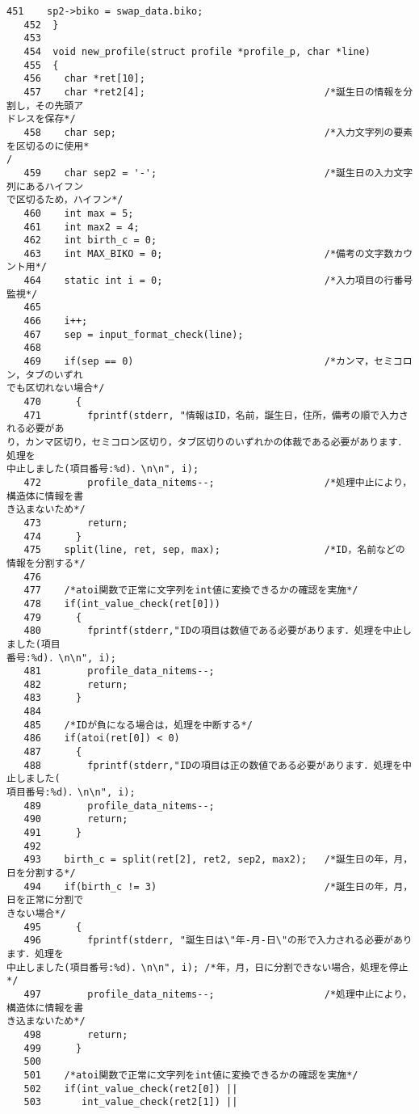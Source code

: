\begin{Verbatim}[fontsize=\small, baselinestretch=0.8]
   451	  sp2->biko = swap_data.biko;
   452	}
   453	
   454	void new_profile(struct profile *profile_p, char *line)
   455	{
   456	  char *ret[10];
   457	  char *ret2[4];                               /*誕生日の情報を分割し，その先頭ア
ドレスを保存*/
   458	  char sep;                                    /*入力文字列の要素を区切るのに使用*
/
   459	  char sep2 = '-';                             /*誕生日の入力文字列にあるハイフン
で区切るため，ハイフン*/
   460	  int max = 5;
   461	  int max2 = 4;
   462	  int birth_c = 0;
   463	  int MAX_BIKO = 0;                            /*備考の文字数カウント用*/
   464	  static int i = 0;                            /*入力項目の行番号監視*/
   465	  
   466	  i++;
   467	  sep = input_format_check(line);
   468	
   469	  if(sep == 0)                                 /*カンマ，セミコロン，タブのいずれ
でも区切れない場合*/
   470	    {
   471	      fprintf(stderr, "情報はID，名前，誕生日，住所，備考の順で入力される必要があ
り，カンマ区切り，セミコロン区切り，タブ区切りのいずれかの体裁である必要があります．処理を
中止しました(項目番号:%d)．\n\n", i);
   472	      profile_data_nitems--;                   /*処理中止により，構造体に情報を書
き込まないため*/
   473	      return;
   474	    }
   475	  split(line, ret, sep, max);                  /*ID，名前などの情報を分割する*/
   476	
   477	  /*atoi関数で正常に文字列をint値に変換できるかの確認を実施*/
   478	  if(int_value_check(ret[0]))
   479	    {
   480	      fprintf(stderr,"IDの項目は数値である必要があります．処理を中止しました(項目
番号:%d)．\n\n", i);
   481	      profile_data_nitems--;
   482	      return;
   483	    }
   484	
   485	  /*IDが負になる場合は，処理を中断する*/
   486	  if(atoi(ret[0]) < 0)
   487	    {
   488	      fprintf(stderr,"IDの項目は正の数値である必要があります．処理を中止しました(
項目番号:%d)．\n\n", i);
   489	      profile_data_nitems--;
   490	      return;
   491	    }
   492	
   493	  birth_c = split(ret[2], ret2, sep2, max2);   /*誕生日の年，月，日を分割する*/
   494	  if(birth_c != 3)                             /*誕生日の年，月，日を正常に分割で
きない場合*/
   495	    {
   496	      fprintf(stderr, "誕生日は\"年-月-日\"の形で入力される必要があります．処理を
中止しました(項目番号:%d)．\n\n", i); /*年，月，日に分割できない場合，処理を停止*/
   497	      profile_data_nitems--;                   /*処理中止により，構造体に情報を書
き込まないため*/
   498	      return;
   499	    }
   500	
   501	  /*atoi関数で正常に文字列をint値に変換できるかの確認を実施*/
   502	  if(int_value_check(ret2[0]) ||
   503	     int_value_check(ret2[1]) ||

\end{Verbatim}
